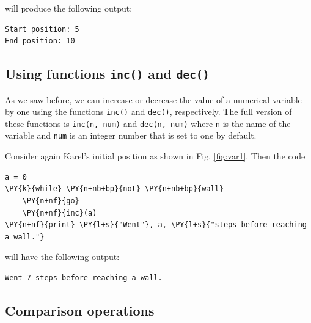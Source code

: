 \noindent
will produce the following output:\\

\begin{ybox}
\begin{verbatim}
Start position: 5
End position: 10
\end{verbatim}
\end{ybox}
\vspace{6mm}

\subsection[\ \ Using functions {\tt inc()} and {\tt dec()}]{Using functions {\tt inc()} and {\tt dec()}}\label{subsec:incdec}

As we saw before, we can increase or decrease the value of a numerical 
variable by one using the functions {\tt inc()} and 
{\tt dec()}, respectively. The full version of these functions 
is {\tt inc(n, num)} and {\tt dec(n, num)} where {\tt n} is the 
name of the variable and {\tt num} is 
an integer number that is set to one by default.

Consider again Karel's initial position as shown 
in Fig. \ref{fig:var1}. Then the code\\

\begin{bbox}
\begin{Verbatim}[commandchars=\\\{\}]
a = 0
\PY{k}{while} \PY{n+nb+bp}{not} \PY{n+nb+bp}{wall}
    \PY{n+nf}{go}
    \PY{n+nf}{inc}(a)
\PY{n+nf}{print} \PY{l+s}{"Went"}, a, \PY{l+s}{"steps before reaching a wall."}
\end{Verbatim}
\end{bbox}
\vspace{6mm}

\noindent
will have the following output:\\

\begin{ybox}
\begin{verbatim}
Went 7 steps before reaching a wall.
\end{verbatim}
\end{ybox}
\vspace{6mm}

\subsection[\ \ Comparison operations]{Comparison operations}

